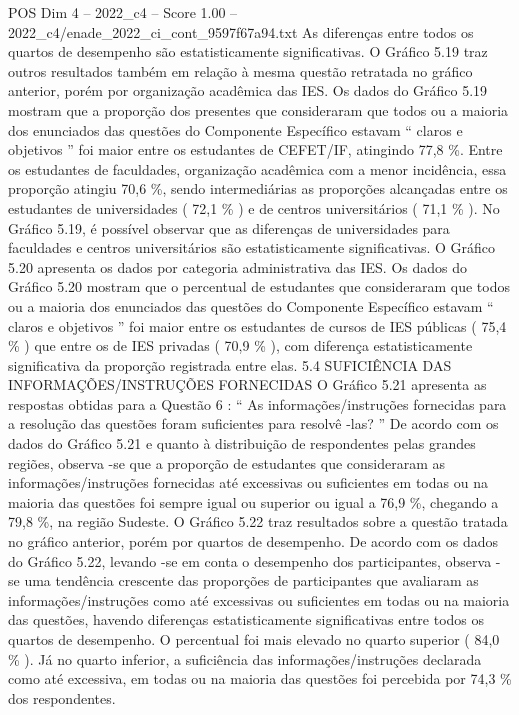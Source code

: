 \begin{textsample}{POS Dim 4 – 2022\_c4 – Score 1.00 – 2022\_c4/enade\_2022\_ci\_cont\_9597f67a94.txt}
As diferenças entre todos os quartos de desempenho são estatisticamente significativas.
O Gráfico 5.19 traz outros resultados também em relação à mesma questão retratada no gráfico anterior, porém por organização acadêmica das IES.
Os dados do Gráfico 5.19 mostram que a proporção dos presentes que consideraram que todos ou a maioria dos enunciados das questões do Componente Específico estavam “ claros e objetivos ” foi maior entre os estudantes de CEFET/IF, atingindo 77,8 \%.
Entre os estudantes de faculdades, organização acadêmica com a menor incidência, essa proporção atingiu 70,6 \%, sendo intermediárias as proporções alcançadas entre os estudantes de universidades ( 72,1 \% ) e de centros universitários ( 71,1 \% ).
No Gráfico 5.19, é possível observar que as diferenças de universidades para faculdades e centros universitários são estatisticamente significativas.
O Gráfico 5.20 apresenta os dados por categoria administrativa das IES.
Os dados do Gráfico 5.20 mostram que o percentual de estudantes que consideraram que todos ou a maioria dos enunciados das questões do Componente Específico estavam “ claros e objetivos ” foi maior entre os estudantes de cursos de IES públicas ( 75,4 \% ) que entre os de IES privadas ( 70,9 \% ), com diferença estatisticamente significativa da proporção registrada entre elas. 5.4 SUFICIÊNCIA DAS INFORMAÇÕES/INSTRUÇÕES FORNECIDAS O Gráfico 5.21 apresenta as respostas obtidas para a Questão 6 : “ As informações/instruções fornecidas para a resolução das questões foram suficientes para resolvê -las? ” De acordo com os dados do Gráfico 5.21 e quanto à distribuição de respondentes pelas grandes regiões, observa -se que a proporção de estudantes que consideraram as informações/instruções fornecidas até excessivas ou suficientes em todas ou na maioria das questões foi sempre igual ou superior ou igual a 76,9 \%, chegando a 79,8 \%, na região Sudeste.
O Gráfico 5.22 traz resultados sobre a questão tratada no gráfico anterior, porém por quartos de desempenho.
De acordo com os dados do Gráfico 5.22, levando -se em conta o desempenho dos participantes, observa -se uma tendência crescente das proporções de participantes que avaliaram as informações/instruções como até excessivas ou suficientes em todas ou na maioria das questões, havendo diferenças estatisticamente significativas entre todos os quartos de desempenho.
O percentual foi mais elevado no quarto superior ( 84,0 \% ).
Já no quarto inferior, a suficiência das informações/instruções declarada como até excessiva, em todas ou na maioria das questões foi percebida por 74,3 \% dos respondentes.

\end{textsample}
